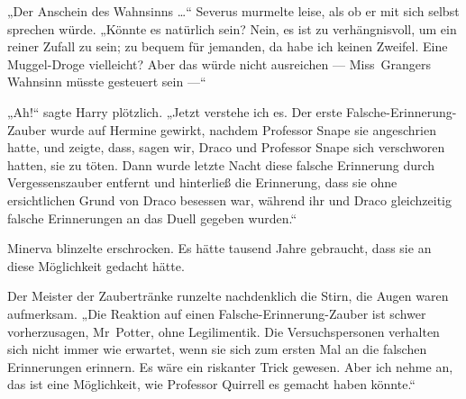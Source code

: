 „Der Anschein des Wahnsinns …“ Severus murmelte leise, als ob er mit sich selbst sprechen würde.
„Könnte es natürlich sein? Nein, es ist zu verhängnisvoll, um ein reiner Zufall zu sein; zu bequem für jemanden, da habe ich keinen Zweifel. Eine Muggel-Droge vielleicht? Aber das würde nicht ausreichen — Miss~Grangers Wahnsinn müsste gesteuert sein —“

„Ah!“ sagte Harry plötzlich.
„Jetzt verstehe ich es. Der erste Falsche-Erinnerung-Zauber wurde auf Hermine gewirkt, nachdem Professor Snape sie angeschrien hatte, und zeigte, dass, sagen wir, Draco und Professor Snape sich verschworen hatten, sie zu töten. Dann wurde letzte Nacht diese falsche Erinnerung durch Vergessenszauber entfernt und hinterließ die Erinnerung, dass sie ohne ersichtlichen Grund von Draco besessen war, während ihr und Draco gleichzeitig falsche Erinnerungen an das Duell gegeben wurden.“

Minerva blinzelte erschrocken. Es hätte tausend Jahre gebraucht, dass sie an diese Möglichkeit gedacht hätte.

Der Meister der Zaubertränke runzelte nachdenklich die Stirn, die Augen waren aufmerksam.
„Die Reaktion auf einen Falsche-Erinnerung-Zauber ist schwer vorherzusagen, Mr~Potter, ohne Legilimentik. Die Versuchspersonen verhalten sich nicht immer wie erwartet, wenn sie sich zum ersten Mal an die falschen Erinnerungen erinnern. Es wäre ein riskanter Trick gewesen. Aber ich nehme an, das ist eine Möglichkeit, wie Professor Quirrell es gemacht haben könnte.“

